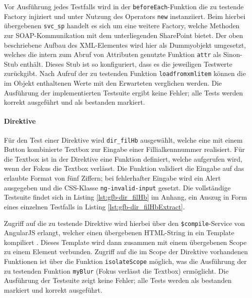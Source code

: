 \begin{figure}[H]
	
\end{figure}

Vor Ausführung jedes Testfalls wird in der \texttt{beforeEach}-Funktion die zu testende Factory injiziert und unter Nutzung des Operators \texttt{new} instanziiert. Beim hierbei übergebenen \texttt{svc\_sp} handelt es sich um eine weitere Factory, welche Methoden zur SOAP-Kommunikation mit dem unterliegenden SharePoint bietet. Der oben beschriebene Aufbau des XML-Elementes wird hier als Dummyobjekt umgesetzt, welches die intern zum Abruf von Attributen genutzte Funktion \texttt{attr} als Sinon-Stub enthält. Dieses Stub ist so konfiguriert, dass es die jeweiligen Testwerte zurückgibt. Nach Aufruf der zu testenden Funktion \texttt{loadfromxmlitem} können die im Objekt enthaltenen Werte mit den Erwarteten verglichen werden. Die Ausführung der implementierten Testsuite ergibt keine Fehler; alle Tests werden korrekt ausgeführt und als bestanden markiert.

\paragraph{Direktive}
Für den Test einer Direktive wird \texttt{dir\_filHb} ausgewählt, welche eine mit einem Button kombinierte Textbox zur Eingabe einer Fillialkennnummer realisiert. Für die Textbox ist in der Direktive eine Funktion definiert, welche aufgerufen wird, wenn der Fokus die Textbox verlässt. Die Funktion validiert die Eingabe auf das erlaubte Format von fünf Ziffern; bei fehlerhafter Eingabe wird ein Alert ausgegeben und die CSS-Klasse \texttt{ng-invalid-input} gesetzt. Die vollständige Testsuite findet sich in Listing \ref{lst:gfb-dir_filHb} im Anhang, ein Auszug in Form eines einzelnen Testfalls in Listing \ref{lst:gfb-dir_filHbExtract}.

\begin{figure}[H]
	
\end{figure}

Zugriff auf die zu testende Direktive wird hierbei über den \texttt{\$compile}-Service von AngularJS erlangt, welcher einen übergebenen HTML-String in ein Template kompiliert \cite{angular-compile}. Dieses Template wird dann zusammen mit einem übergebenen Scope zu einem Element verbunden. Zugriff auf die im Scope der Direktive vorhandenen Funktionen ist über die Funktion \texttt{isolateScope} möglich, was die Ausführung der zu testenden Funktion \texttt{myBlur} (Fokus verlässt die Textbox) ermöglicht. Die Ausführung der Testsuite zeigt keine Fehler; alle Tests werden als bestanden markiert und korrekt ausgeführt.

